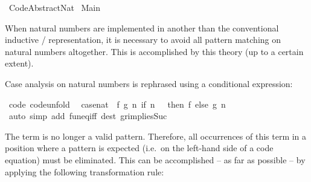 %
\begin{isabellebody}%
\def\isabellecontext{Code{\isacharunderscore}Abstract{\isacharunderscore}Nat}%
%
\isamarkuptrue%
%
\isadelimtheory
%
\endisadelimtheory
%
\isatagtheory
{}\isamarkupfalse%
\ Code{\isacharunderscore}Abstract{\isacharunderscore}Nat\isanewline
{}\ Main\isanewline
{}%
\endisatagtheory
{\isafoldtheory}%
%
\isadelimtheory
%
\endisadelimtheory
%
\begin{isamarkuptext}%
When natural numbers are implemented in another than the
  conventional inductive / representation,
  it is necessary to avoid all pattern matching on natural numbers
  altogether.  This is accomplished by this theory (up to a certain
  extent).%
\end{isamarkuptext}%
\isamarkuptrue%
%
\isamarkuptrue%
%
\begin{isamarkuptext}%
Case analysis on natural numbers is rephrased using a conditional
  expression:%
\end{isamarkuptext}%
\isamarkuptrue%
\isamarkupfalse%
\ {\isacharbrackleft}code{\isacharcomma}\ code{\isacharunderscore}unfold{\isacharbrackright}{\isacharcolon}\isanewline
\ \ {\isachardoublequoteopen}case{\isacharunderscore}nat\ {\isacharequal}\ {\isacharparenleft}{\isasymlambda}f\ g\ n{\isachardot}\ if\ n\ {\isacharequal}\ {}\ then\ f\ else\ g\ {\isacharparenleft}n\ {\isacharminus}\ {}{\isacharparenright}{\isacharparenright}{\isachardoublequoteclose}\isanewline
%
\isadelimproof
\ \ %
\endisadelimproof
%
\isatagproof
{}\isamarkupfalse%
\ {\isacharparenleft}auto\ simp\ add{\isacharcolon}\ fun{\isacharunderscore}eq{\isacharunderscore}iff\ dest{\isacharbang}{\isacharcolon}\ gr{}{\isacharunderscore}implies{\isacharunderscore}Suc{\isacharparenright}%
\endisatagproof
{\isafoldproof}%
%
\isadelimproof
%
\endisadelimproof
%
\isamarkuptrue%
%
\begin{isamarkuptext}%
The term  is no longer a valid pattern.  Therefore,
  all occurrences of this term in a position where a pattern is
  expected (i.e.~on the left-hand side of a code equation) must be
  eliminated.  This can be accomplished -- as far as possible -- by
  applying the following transformation rule:%
\end{isamarkuptext}%
\isamarkuptrue%
\isamarkupfalse%

\end{isabellebody}
